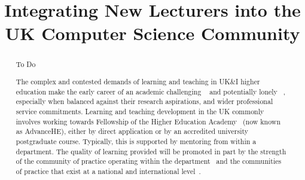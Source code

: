 \documentclass[sigconf]{acmart}
\begin{document}
\title{Integrating New Lecturers into the UK Computer Science Community}


\renewcommand{\shortauthors}{Trovato and Tobin, et al.}

\begin{abstract}
  To Do
  
  
  
  The complex and contested demands of learning and teaching in UK\&I
higher education make the early career of an academic challenging ~\cite{Thomas2015} and potentially lonely ~\cite{Foote2009},
especially when balanced against their research aspirations, and wider professional service
commitments. Learning and teaching
development in the UK commonly involves working
towards Fellowship of the Higher Education Academy~\cite{fellowship}
(now known as AdvanceHE), either by direct application or by an
accredited university postgraduate course. Typically, this is
supported by mentoring from within a department. The quality of
learning provided will be promoted in part by the
strength of the community of practice operating within the
department~\cite{Bolander2008} and the communities of practice that
exist at a national and international level~\cite{Thomas2015}.



\end{abstract}
\end{document}

